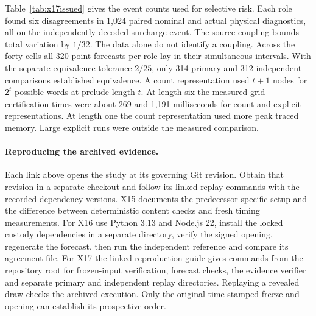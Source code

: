 Table~\ref{tab:x17issued} gives the event counts used for selective risk. Each role found six disagreements in 1,024 paired nominal and actual physical diagnostics, all on the independently decoded surcharge event. The source coupling bounds total variation by $1/32$. The data alone do not identify a coupling. Across the forty cells all 320 point forecasts per role lay in their simultaneous intervals. With the separate equivalence tolerance $2/25$, only 314 primary and 312 independent comparisons established equivalence. A count representation used $t+1$ nodes for $2^t$ possible words at prelude length $t$. At length six the measured grid certification times were about 269 and 1,191 milliseconds for count and explicit representations. At length one the count representation used more peak traced memory. Large explicit runs were outside the measured comparison.

\paragraph{Reproducing the archived evidence.}
Each link above opens the study at its governing Git revision. Obtain that revision in a separate checkout and follow its linked replay commands with the recorded dependency versions. X15 documents the predecessor-specific setup and the difference between deterministic content checks and fresh timing measurements. For X16 use Python 3.13 and Node.js 22, install the locked custody dependencies in a separate directory, verify the signed opening, regenerate the forecast, then run the independent reference and compare its agreement file. For X17 the linked reproduction guide gives commands from the repository root for frozen-input verification, forecast checks, the evidence verifier and separate primary and independent replay directories. Replaying a revealed draw checks the archived execution. Only the original time-stamped freeze and opening can establish its prospective order.
\endgroup
